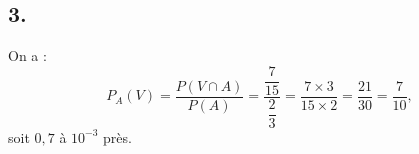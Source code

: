 \documentclass[10pt]{article}
\begin{document}
\subsection*{3.}

On a :
\[
P_A(V) = \frac{P(V \cap A)}{P(A)} = \frac{\dfrac{7}{15}}{\dfrac{2}{3}} = \frac{7 \times 3}{15 \times 2} = \frac{21}{30} = \dfrac{7}{10},
\]
soit \(0{,}7\) à \(10^{-3}\) près.
\end{document}
